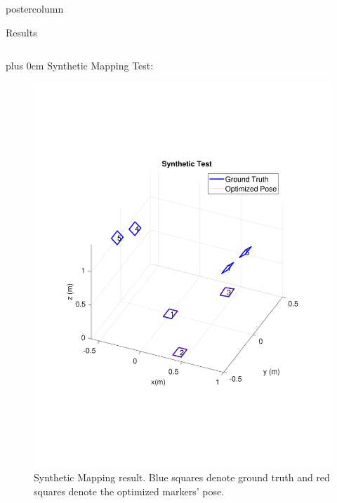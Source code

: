 \documentclass{beamer}
\renewcommand{\raggedright}{\leftskip=0pt \rightskip=0pt plus 0cm}
\begin{document}
\begin{frame}
\begin{columns}
\begin{column}{.57\textwidth}
\begin{beamercolorbox}[center]{postercolumn}
\begin{minipage}{.98\textwidth}
{\begin{myblock}{Results}
\begin{minipage}[0.3\textheight]{\textwidth}
\begin{columns}[T]
\begin{column}{0.33\textwidth}
\raggedright
Synthetic Mapping Test: 
\begin{figure}
\centering
\includegraphics[width=1.0\textwidth]{img/synthetic_3d_new}
\caption{Synthetic Mapping result. Blue squares denote ground truth and red squares denote the optimized markers' pose.}
\label{fig:synthetic_3d}
\end{figure}
\begin{figure}
\centering

\end{figure}
\end{column}
\end{columns}
\end{minipage}
\end{myblock}}
\end{minipage}
\end{beamercolorbox}
\end{column}
\end{columns}
\end{frame}
\end{document}
